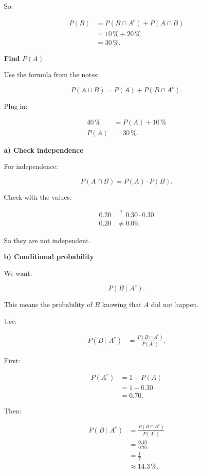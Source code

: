 \documentclass[10pt]{article}
\begin{document}
So:

\begin{align*}
P(B)
&=
P(B\cap A^c)
+P(A\cap B) \\[2mm]
&=
10\,\%+20\,\% \\[2mm]
&=30\,\%.
\end{align*}

\textbf{Find $P(A)$}

Use the formula from the notes:

\[
P(A\cup B)=P(A)+P(B\cap A^c).
\]

Plug in:

\begin{align*}
40\,\%
&=
P(A)+10\,\% \\[2mm]
P(A)
&=
30\,\%.
\end{align*}

\RepeatedQuestion{\uppgiftOneQuestion}
\textbf{a) Check independence}

For independence:

\[
P(A\cap B)=P(A)\cdot P(B).
\]

Check with the values:

\begin{align*}
0.20
&\stackrel{?}{=}
0.30\cdot 0.30 \\[2mm]
0.20
&\neq 0.09.
\end{align*}

So they are not independent.

\RepeatedQuestion{\uppgiftOneQuestion}
\textbf{b) Conditional probability}

We want:

\[
P(B\mid A^c).
\]

This means the probability of $B$ knowing that $A$ did not happen.

Use:

\begin{align*}
P(B\mid A^c)
&=
\frac{P(B\cap A^c)}{P(A^c)}.
\end{align*}

First:

\begin{align*}
P(A^c)
&=
1-P(A) \\[2mm]
&=
1-0.30 \\[2mm]
&=0.70.
\end{align*}

Then:

\begin{align*}
P(B\mid A^c)
&=
\frac{P(B\cap A^c)}{P(A^c)} \\[2mm]
&=
\frac{0.10}{0.70} \\[2mm]
&=
\frac{1}{7} \\[2mm]
&\approx 14.3\,\%.
\end{align*}
\end{document}
